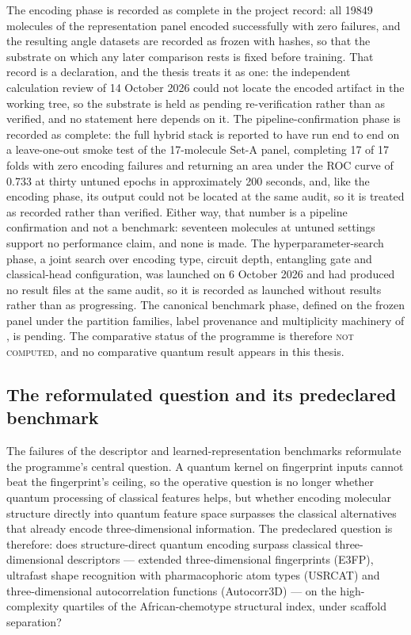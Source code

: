 The encoding phase is recorded as complete in the project record: all \num{19849} molecules of the representation panel encoded successfully with zero failures, and the resulting angle datasets are recorded as frozen with hashes, so that the substrate on which any later comparison rests is fixed before training. That record is a declaration, and the thesis treats it as one: the independent calculation review of 14 October 2026 could not locate the encoded artifact in the working tree, so the substrate is held as pending re-verification rather than as verified, and no statement here depends on it. The pipeline-confirmation phase is recorded as complete: the full hybrid stack is reported to have run end to end on a leave-one-out smoke test of the \num{17}-molecule Set-A panel, completing \num{17} of \num{17} folds with zero encoding failures and returning an area under the ROC curve of \num{0.733} at thirty untuned epochs in approximately \num{200} seconds, and, like the encoding phase, its output could not be located at the same audit, so it is treated as recorded rather than verified. Either way, that number is a pipeline confirmation and not a benchmark: seventeen molecules at untuned settings support no performance claim, and none is made. The hyperparameter-search phase, a joint search over encoding type, circuit depth, entangling gate and classical-head configuration, was launched on 6 October 2026 and had produced no result files at the same audit, so it is recorded as launched without results rather than as progressing. The canonical benchmark phase, defined on the frozen panel under the partition families, label provenance and multiplicity machinery of , is pending. The comparative status of the programme is therefore \textsc{not computed}, and no comparative quantum result appears in this thesis.

\subsection{The reformulated question and its predeclared benchmark}\label{sec:res_qmse_benchmark}

The failures of the descriptor and learned-representation benchmarks reformulate the programme's central question. A quantum kernel on fingerprint inputs cannot beat the fingerprint's ceiling, so the operative question is no longer whether quantum processing of classical features helps, but whether encoding molecular structure directly into quantum feature space surpasses the classical alternatives that already encode three-dimensional information. The predeclared question is therefore: does structure-direct quantum encoding surpass classical three-dimensional descriptors --- extended three-dimensional fingerprints (E3FP), ultrafast shape recognition with pharmacophoric atom types (USRCAT) and three-dimensional autocorrelation functions (Autocorr3D) --- on the high-complexity quartiles of the African-chemotype structural index, under scaffold separation?

